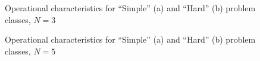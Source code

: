 \documentclass[twocolumn]{svjour3}          %
\begin{document}
\begin{figure}[h!]
\begin{minipage}[h]{0.48\linewidth}
	\end{minipage}
	\caption{Operational characteristics for “Simple” (a) and “Hard” (b) problem classes, $N = 3$}
	\label{fig:operational_characteristics_N=3}
\end{figure}

\begin{figure}[h!]
	\begin{minipage}[h]{0.48\linewidth}
	\end{minipage}
	\hfill
	\begin{minipage}[h]{0.48\linewidth}
	\end{minipage}
	\caption{Operational characteristics for “Simple” (a) and “Hard” (b) problem classes, $N = 5$}
	\label{fig:operational_characteristics_N=5}
\end{figure}
\end{document}
